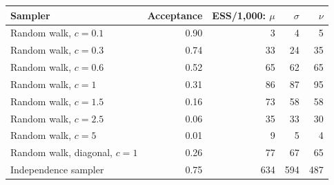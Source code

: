 \begin{tabular}{lrrrr}
\toprule
Sampler & Acceptance & ESS/1,000: $\mu$ & $\sigma$ & $\nu$ \\
\midrule
Random walk, $c = 0.1$ & 0.90 & 3 & 4 & 5 \\
Random walk, $c = 0.3$ & 0.74 & 33 & 24 & 35 \\
Random walk, $c = 0.6$ & 0.52 & 65 & 62 & 65 \\
Random walk, $c = 1$ & 0.31 & 86 & 87 & 95 \\
Random walk, $c = 1.5$ & 0.16 & 73 & 58 & 58 \\
Random walk, $c = 2.5$ & 0.06 & 35 & 33 & 30 \\
Random walk, $c = 5$ & 0.01 & 9 & 5 & 4 \\
Random walk, diagonal, $c = 1$ & 0.26 & 77 & 67 & 65 \\
Independence sampler & 0.75 & 634 & 594 & 487 \\
\bottomrule
\end{tabular}
